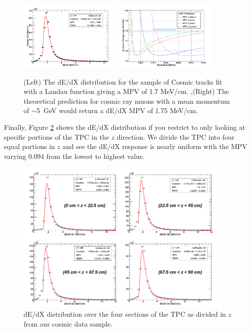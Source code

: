 \begin{figure}[htb]
\centering
\includegraphics[width=0.45\textwidth]{images/CosmicdEdX.png}
\includegraphics[width=0.45\textwidth]{images/CosmicRayExpectation.png}
\caption{(Left) The dE/dX distribution for the sample of Cosmic tracks fit with a Landau function giving a MPV of 1.7 MeV/cm. ,(Right) The theoretical prediction for cosmic ray muons with a mean momentum of $\sim$5~GeV would return a dE/dX MPV of 1.75 MeV/cm.}
\label{fig:CosmicdEdX}
\end{figure}

Finally, Figure \ref{fig:CosmicdEdXSections} shows the dE/dX distribution if you restrict to only looking at specific portions of the TPC in the $z$ direction. We divide the TPC into four equal portions in $z$ and see the dE/dX response is nearly uniform with the MPV varying 0.094 from the lowest to highest value. 

\begin{figure}[htb]
\centering
\includegraphics[width=0.95\textwidth]{images/CosmicFourSections.png}
\caption{dE/dX distribution over the four sections of the TPC as divided in $z$ from our cosmic data sample.}
\label{fig:CosmicdEdXSections}
\end{figure}



